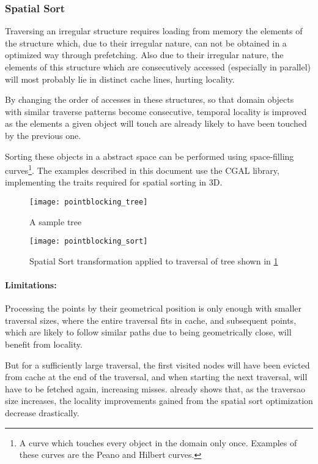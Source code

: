 \subsubsection{Spatial Sort}
\label{sec:optim:sort}

Traversing an irregular structure requires loading from memory the elements of the structure which, due to their irregular nature, can not be obtained in a optimized way through prefetching. Also due to their irregular nature, the elements of this structure which are consecutively accessed (especially in parallel) will most probably lie in distinct cache lines, hurting locality.

By changing the order of accesses in these structures, so that domain objects with similar traverse patterns become consecutive, temporal locality is improved as the elements a given object will touch are already likely to have been touched by the previous one.

Sorting these objects in a abstract space can be performed using space-filling curves\footnote{A curve which touches every object in the domain only once. Examples of these curves are the Peano and Hilbert curves.}. The examples described in this document use the CGAL library, implementing the traits required for spatial sorting in 3D.

\begin{figure}[!htp]
	\centering
	\texttt{[image: pointblocking\_tree]}
	\caption{A sample tree}
	\label{fig:tree}
\end{figure}

\begin{figure}[!htp]
	\centering
	\texttt{[image: pointblocking\_sort]}
	\caption{Spatial Sort transformation applied to traversal of tree shown in \cref{fig:tree}}
	\label{fig:sort}
\end{figure}

\paragraph{Limitations:}
Processing the points by their geometrical position is only enough with smaller traversal sizes, where the entire traversal fits in cache, and subsequent points, which are likely to follow similar paths due to being geometrically close, will benefit from locality.

But for a sufficiently large traversal, the first visited nodes will have been evicted from cache at the end of the traversal, and when starting the next traversal, will have to be fetched again, increasing misses. \cite{tree_tiler} already shows that, as the traversao size increases, the locality improvements gained from the spatial sort optimization decrease drastically.